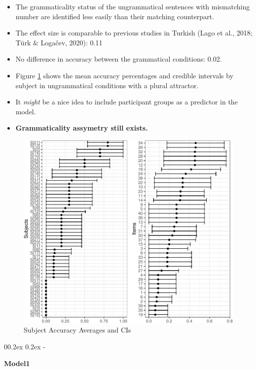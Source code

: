 \documentclass[
  10pt,
  english,
  doc,floatsintext]{apa6}
\makeatletter
\providecommand{\tightlist}{%
  \setlength{\itemsep}{0pt}\setlength{\parskip}{0pt}}
\let\oldsubparagraph\subparagraph
\renewcommand{\subparagraph}[1]{\oldsubparagraph{#1}\mbox{}}
\renewcommand{\subparagraph}[1]{\@startsection{subparagraph}{5}{1em}%
  {0\baselineskip \@plus 0.2ex \@minus 0.2ex}%
  {-\z@\relax}%
  {\normalfont\normalsize\itshape\hspace{\parindent}{#1}\textit{\addperi}}{\relax}}
\makeatother
\begin{document}
\begin{itemize}
\tightlist
\item
  The grammaticality status of the ungrammatical sentences with mismatching number are identified less easily than their matching counterpart.
\item
  The effect size is comparable to previous studies in Turkish (Lago et al., 2018; Türk \& Logačev, 2020): 0.11
\item
  No difference in accuracy between the grammatical conditions: 0.02.
\item
  Figure \ref{fig:UngBiasSubjDiff} shows the mean accuracy percentages and credible intervals by subject in ungrammatical conditions with a plural attractor.
\item
  It \emph{might} be a nice idea to include participant groups as a predictor in the model.
\item
  \textbf{Grammaticality assymetry still exists.}
\end{itemize}

\begin{figure}
\centering
\includegraphics{paperdraft_files/figure-latex/UngBiasSubjDiff-1.pdf}
\caption{\label{fig:UngBiasSubjDiff}Subject Accuracy Averages and CIs}
\end{figure}

\hypertarget{modelling}{%
\subparagraph{Modelling}\label{modelling}}

\textbf{Model1}
\end{document}
